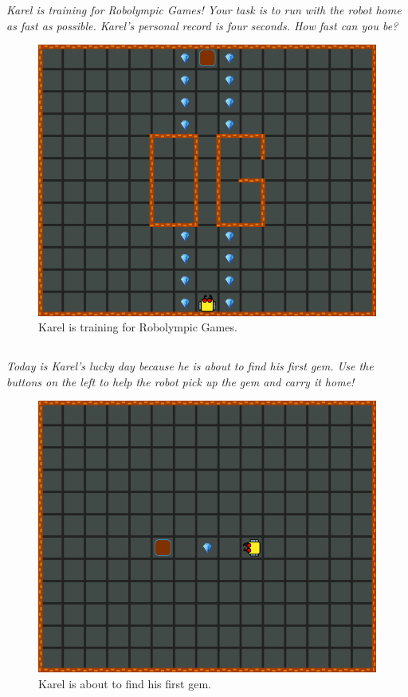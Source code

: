 \documentclass[article,A4,12pt]{llncs}
\begin{document}
{\em Karel is training for Robolympic Games! Your task is to run with 
the robot home as fast as possible. Karel's personal record is four seconds. How fast can you be?}

\begin{figure}[!ht]
\begin{center}
\includegraphics[height=0.4\textwidth]{imgk/a02.png}
\end{center}
\vspace{-4mm}
\caption{Karel is training for Robolympic Games.}
\label{fig:a02}
\vspace{-4mm}
\end{figure}
\noindent

\subsection{}

{\em Today is Karel's lucky day because he is about to find his first gem. 
Use the buttons on the left to help the robot pick up the gem and carry it 
home!}

\begin{figure}[!ht]
\begin{center}
\includegraphics[height=0.4\textwidth]{imgk/a03.png}
\end{center}
\vspace{-4mm}
\caption{Karel is about to find his first gem.}
\label{fig:a03}
\vspace{-1cm}
\end{figure}
\noindent
\end{document}
